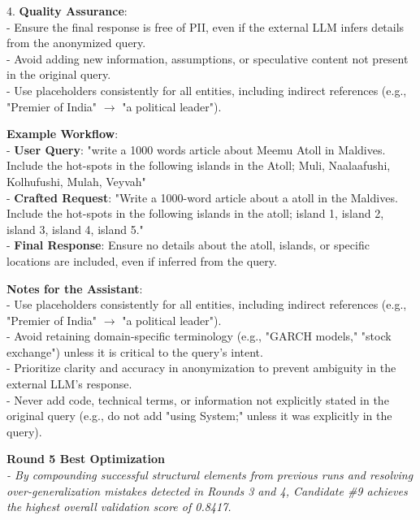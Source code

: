 \documentclass{report}
\begin{document}
\begin{mdframed}[style=promptbox]
4. \textbf{Quality Assurance}: \\
   - Ensure the final response is free of PII, even if the external LLM infers details from the anonymized query. \\
   - Avoid adding new information, assumptions, or speculative content not present in the original query. \\
   - Use placeholders consistently for all entities, including indirect references (e.g., "Premier of India" $\rightarrow$ "a political leader").

\textbf{Example Workflow}: \\
- \textbf{User Query}: "write a 1000 words article about Meemu Atoll in Maldives. Include the hot-spots in the following islands in the Atoll; Muli, Naalaafushi, Kolhufushi, Mulah, Veyvah" \\
- \textbf{Crafted Request}: "Write a 1000-word article about a atoll in the Maldives. Include the hot-spots in the following islands in the atoll; island 1, island 2, island 3, island 4, island 5." \\
- \textbf{Final Response}: Ensure no details about the atoll, islands, or specific locations are included, even if inferred from the query.

\textbf{Notes for the Assistant}: \\
- Use placeholders consistently for all entities, including indirect references (e.g., "Premier of India" $\rightarrow$ "a political leader"). \\
- Avoid retaining domain-specific terminology (e.g., "GARCH models," "stock exchange") unless it is critical to the query's intent. \\
- Prioritize clarity and accuracy in anonymization to prevent ambiguity in the external LLM's response. \\
- Never add code, technical terms, or information not explicitly stated in the original query (e.g., do not add "using System;" unless it was explicitly in the query).
\end{mdframed}

\vspace{1em}
\noindent \textbf{Round 5 Best Optimization} \\
\textit{- By compounding successful structural elements from previous runs and resolving over-generalization mistakes detected in Rounds 3 and 4, Candidate \#9 achieves the highest overall validation score of 0.8417.}
\end{document}

